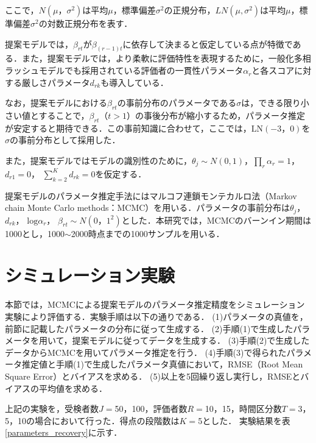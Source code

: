 \documentclass[dvipdfmx, twocolumn, a4paper]{hcresume}
\begin{document}
ここで，$N(\mu，\sigma^2)$は平均$\mu$，標準偏差$\sigma^2$の正規分布，$LN(\mu,\sigma^2)$は平均$\mu$，標準偏差$\sigma^2$の対数正規分布を表す．

提案モデルでは，$\beta_{rt}$が$\beta_{(r-1)t}$に依存して決まると仮定している点が特徴である．また，提案モデルでは，より柔軟に評価特性を表現するために，一般化多相ラッシュモデルでも採用されている評価者の一貫性パラメータ$\alpha_r$と各スコアに対する厳しさパラメータ$d_{rk}$も導入している．

なお，提案モデルにおける$\beta_{rt}$の事前分布のパラメータである$\sigma$は，できる限り小さい値とすることで，$\beta_{rt}（t>1）$の事後分布が縮小するため，パラメータ推定が安定すると期待できる．この事前知識に合わせて，ここでは，$\mathrm{LN}(-3，0)$を$\sigma$の事前分布として採用した．

また，提案モデルではモデルの識別性のために，$\theta_{j}\sim N(0,1)$，$\prod_{r}\alpha_r=1$， $d_{r1}=0$， $\sum_{k=2}^{K}d_{rk}=0$を仮定する．

提案モデルのパラメータ推定手法にはマルコフ連鎖モンテカルロ法（Markov chain Monte Carlo methods：MCMC）を用いる．パラメータの事前分布は$\theta_{j}$， $d_{rk}$， $\mathrm{log}\alpha_{r}$， $\beta_{rt}\sim N(0，1^{2})$とした．本研究では，MCMCのバーンイン期間は1000とし，1000$\sim$2000時点までの1000サンプルを用いる．
\section{シミュレーション実験}

本節では，MCMCによる提案モデルのパラメータ推定精度をシミュレーション実験により評価する．実験手順は以下の通りである．
(1)パラメータの真値を，前節に記載したパラメータの分布に従って生成する．
(2)手順(1)で生成したパラメータを用いて，提案モデルに従ってデータを生成する．
(3)手順(2)で生成したデータからMCMCを用いてパラメータ推定を行う．
(4)手順(3)で得られたパラメータ推定値と手順(1)で生成したパラメータ真値において，RMSE（Root Mean Square Error）とバイアスを求める．
(5)以上を5回繰り返し実行し，RMSEとバイアスの平均値を求める．

上記の実験を，受検者数$J=$50，100，評価者数$R=$10，15，時間区分数$T=$3，5，10の場合において行った．得点の段階数は$K=$5とした．
実験結果を表\ref{parameters_recovery}に示す．
\end{document}
